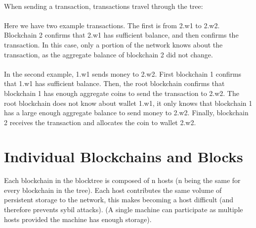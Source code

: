 \documentclass[a4paper,10pt]{article}
\begin{document}
\paragraph{}
When sending a transaction, transactions travel through the tree:
\linebreak

\paragraph{}
Here we have two example transactions. The first is from 2.w1 to 2.w2. 
Blockchain 2 confirms that 2.w1 has sufficient balance, and then confirms the 
transaction. In this case, only a portion of the network knows about the 
transaction, as the aggregate balance of blockchain 2 did not change.
\paragraph{}
In the second example, 1.w1 sends money to 2.w2. First blockchain 1 confirms 
that 1.w1 has sufficient balance. Then, the root blockchain confirms that 
blockchain 1 has enough aggregate coins to send the transaction to 2.w2. The 
root blockchain does not know about wallet 1.w1, it only knows that blockchain 
1 has a large enough aggregate balance to send money to 2.w2. Finally, 
blockchain 2 receives the transaction and allocates the coin to wallet 2.w2.

\section{Individual Blockchains and Blocks}
\paragraph{}
Each blockchain in the blocktree is composed of n hosts (n being the same for 
every blockchain in the tree). Each host contributes the same volume of 
persistent storage to the network, this makes becoming a host difficult (and 
therefore prevents sybil attacks). (A single machine can participate as 
multiple hosts provided the machine has enough storage).
\end{document}
